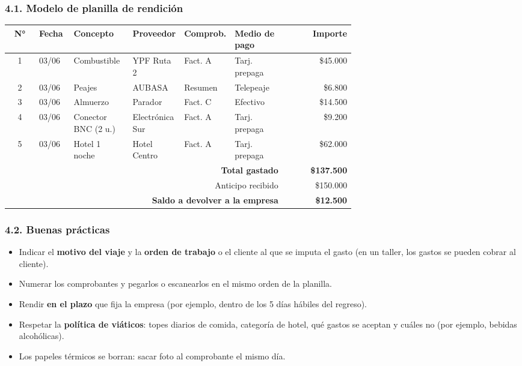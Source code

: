 \subsubsection*{4.1. Modelo de planilla de rendición}
\begin{center}
\footnotesize
\setlength{\tabcolsep}{3pt}
\begin{tabular}{|c|p{0.10\linewidth}|p{0.17\linewidth}|p{0.14\linewidth}|p{0.11\linewidth}|p{0.15\linewidth}|r|}
\hline
\textbf{N°} & \textbf{Fecha} & \textbf{Concepto} & \textbf{Proveedor} & \textbf{Comprob.}
& \textbf{Medio de pago} & \textbf{Importe} \\ \hline
1 & 03/06 & Combustible & YPF Ruta 2 & Fact. A & Tarj. prepaga & \$45.000 \\ \hline
2 & 03/06 & Peajes & AUBASA & Resumen & Telepeaje & \$6.800 \\ \hline
3 & 03/06 & Almuerzo & Parador & Fact. C & Efectivo & \$14.500 \\ \hline
4 & 03/06 & Conector BNC (2 u.) & Electrónica Sur & Fact. A & Tarj. prepaga & \$9.200 \\
\hline
5 & 03/06 & Hotel 1 noche & Hotel Centro & Fact. A & Tarj. prepaga & \$62.000 \\ \hline
\multicolumn{6}{|r|}{\textbf{Total gastado}} & \textbf{\$137.500} \\ \hline
\multicolumn{6}{|r|}{Anticipo recibido} & \$150.000 \\ \hline
\multicolumn{6}{|r|}{\textbf{Saldo a devolver a la empresa}} & \textbf{\$12.500} \\ \hline
\end{tabular}
\end{center}

\subsubsection*{4.2. Buenas prácticas}
\begin{itemize}
  \item Indicar el \textbf{motivo del viaje} y la \textbf{orden de trabajo} o el cliente al
        que se imputa el gasto (en un taller, los gastos se pueden cobrar al cliente).
  \item Numerar los comprobantes y pegarlos o escanearlos en el mismo orden de la planilla.
  \item Rendir \textbf{en el plazo} que fija la empresa (por ejemplo, dentro de los 5 días
        hábiles del regreso).
  \item Respetar la \textbf{política de viáticos}: topes diarios de comida, categoría de hotel,
        qué gastos se aceptan y cuáles no (por ejemplo, bebidas alcohólicas).
  \item Los papeles térmicos se borran: sacar foto al comprobante el mismo día.
\end{itemize}

